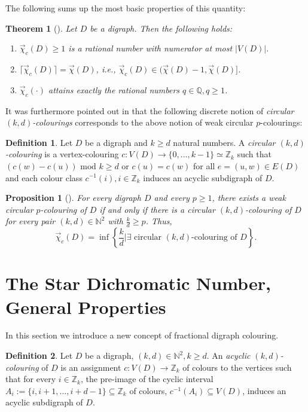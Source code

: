 \documentclass[fontsize=11pt,a4paper,DIV12]{scrartcl}
\theoremstyle{meiner}
\newtheorem{theorem}{Theorem}
\newtheorem{proposition}{Proposition}
\theoremstyle{definition}
\newtheorem{definition}{Definition}
\begin{document}
The following sums up the most basic properties of this quantity:

\begin{theorem}[\cite{bokal}] \label{PropertiesCircularDi}
Let $D$ be a digraph. Then the following holds:
\begin{enumerate}
\item[(i)] $\vec{\chi}_c(D) \ge 1$ is a rational number with numerator at most $|V(D)|$.
\item[(ii)] $\lceil \vec{\chi}_c(D) \rceil=\vec{\chi}(D)$, i.e., $\vec{\chi}_c(D) \in (\vec{\chi}(D)-1,\vec{\chi}(D)]$.
\item[(iii)] $\vec{\chi}_c(\cdot)$ attains exactly the rational numbers $q \in \mathbb{Q}, q \ge 1$.
\end{enumerate}
\end{theorem}
It was furthermore pointed out in \cite{mastert} that the following discrete notion of \emph{circular $(k,d)$-colourings} corresponds to the above notion of weak circular $p$-colourings:
\begin{definition} \label{DefCirc}
Let $D$ be a digraph and $k \ge d$ natural numbers. A \emph{circular $(k,d)$-colouring} is a vertex-colouring $c:V(D) \rightarrow \{0,...,k-1\} \simeq \mathbb{Z}_k$ such that $(c(w)-c(u)) \text{ mod }k \ge d$ or $c(u)=c(w)$ for all $e=(u,w) \in E(D)$ and each colour class $c^{-1}(i), i \in \mathbb{Z}_k$ induces an acyclic subdigraph of $D$.
\end{definition}

\begin{proposition}[\cite{mastert}]
  For every digraph $D$ and every $p \ge 1$, there exists a weak
  circular $p$-colouring of $D$ if and only if there is a circular
  $(k,d)$-colouring of $D$ for every pair $(k,d) \in \mathbb{N}^2$
  with $\frac{k}{d} \ge p$. Thus,
$$\vec{\chi}_c(D)=\inf\left\{\frac{k}{d} \bigg\vert \exists \text{ circular }(k,d)\text{-colouring of }D \right\}.$$
\end{proposition}

\section{The Star Dichromatic Number, General Properties}
In this section we introduce a new concept of fractional digraph colouring. 

\begin{definition} \label{DefDir} Let $D$ be a digraph, $(k,d) \in
  \mathbb{N}^2, k \ge d$. An \emph{acyclic $(k,d)$-colouring} of $D$
  is an assignment $c:V(D) \rightarrow \mathbb{Z}_k$ of colours to the
  vertices such that for every $i \in \mathbb{Z}_k$, the pre-image of
  the cyclic interval $A_i:=\{i,i+1,...,i+d-1\} \subseteq
  \mathbb{Z}_k$ of colours, $c^{-1}(A_i) \subseteq V(D)$, induces an
  acyclic subdigraph of $D$.
\end{definition}
\end{document}
